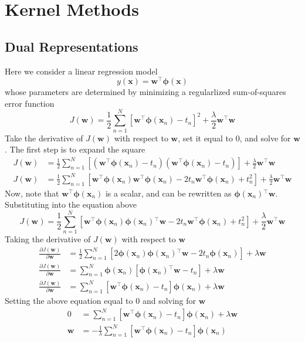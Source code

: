 \documentclass[12pt]{article}
\newcommand{\x}{\mathbf{x}}
\newcommand{\w}{\mathbf{w}}
\newcommand{\sumN}{\sum \limits_{n=1}^N}
\newcommand{\Jw}{J\left(\w{}\right)}
\newcommand{\wTransW}{\w{}^\top\w{}}
\newcommand{\dJdW}{\frac{\partial \Jw{}}{\partial \w{}}}
\newcommand{\phiX}{\mathbf{\phi}\left(\x{}\right)}
\newcommand{\phiXn}{\mathbf{\phi}\left(\x{}_n\right)}
\newcommand{\wTransPhi}{\w{}^\top\phiXn{}}
\newcommand{\phiTransW}{\phiXn{}^\top\w{}}
\begin{document}
\section{Kernel Methods}
\subsection{Dual Representations}
Here we consider a linear regression model
%
\begin{equation*}
  y\left(\x{}\right) = \w{}^\top\phiX{}
\end{equation*}
%
whose parameters are determined by minimizing a regularlized sum-of-squares
error function
%
\begin{equation*}
  \Jw{} = \frac{1}{2}\sumN{}\left[\wTransPhi{} - t_n\right]^2 +
  \frac{\lambda}{2}\wTransW{}
\end{equation*}
%
Take the derivative of $\Jw{}$ with respect to $\w{}$, set it equal to $0$, and
solve for $\w{}$. The first step is to expand the square
%
\begin{align*}
  \Jw{} &= \frac{1}{2}\sumN{}
  \left[\left(\wTransPhi{} - t_n\right)\left(\wTransPhi{} - t_n\right)\right] +
  \frac{\lambda}{2}\wTransW{} \\
  \Jw{} &= \frac{1}{2}\sumN{}
  \left[\wTransPhi{}\wTransPhi{} - 2t_n\wTransPhi{} + t_n^2\right] +
  \frac{\lambda}{2}\wTransW{}
\end{align*}
%
Now, note that $\wTransPhi{}$ is a scalar, and can be rewritten as
$\phiTransW{}$. Substituting into the equation above
%
\begin{equation*}
  \Jw{} = \frac{1}{2}\sumN{}
  \left[\wTransPhi{}\phiTransW{} - 2t_n\wTransPhi{} + t_n^2\right] +
  \frac{\lambda}{2}\wTransW{}
\end{equation*}
%
Taking the derivative of $\Jw{}$ with respect to $\w{}$
%
\begin{align*}
  \dJdW{} &= \frac{1}{2}\sumN{}
  \left[2\phiXn{}\phiXn{}^\top\w{} - 2t_n\phiXn{}\right] + \lambda\w{} \\
  \dJdW{} &= \sumN{}\phiXn{}\left[\phiTransW{} - t_n\right] + \lambda\w{} \\
  \dJdW{} &= \sumN{}\left[\wTransPhi{} - t_n\right]\phiXn{} + \lambda\w{}
\end{align*}
%
Setting the above equation equal to $0$ and solving for $\w{}$
\begin{align*}
  0 &= \sumN{}\left[\wTransPhi{} - t_n\right]\phiXn{} + \lambda\w{} \\
  \w{} &= -\frac{1}{\lambda}\sumN{}\left[\wTransPhi{} - t_n\right]\phiXn{}
\end{align*}
\end{document}

